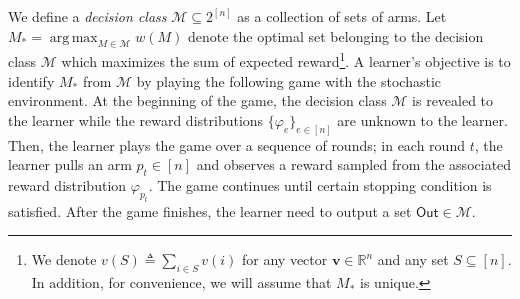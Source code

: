 \documentclass{article}
\newcommand{\Rew}{\varphi}
\newcommand{\E}{\mathbb E}
\newcommand{\M}{\mathcal M}
\newcommand{\RR}{\mathbb R}
\DeclareMathOperator*{\argmax}{arg\,max}
\newcommand{\out}{\mathsf{Out}}
\renewcommand{\vec}[1]{\boldsymbol{#1}}
\begin{document}
We define a \emph{decision class} $\M \subseteq 2^{[n]}$ as a  collection of sets of arms.
Let $M_*=\argmax_{M\in \M} w(M)$ denote the optimal set belonging to the decision class $\M$ which maximizes the sum of expected reward\footnote{We denote $v(S)\triangleq \sum_{i\in S} v(i)$ for any vector $\vec v\in\RR^{n}$ and any set $S \subseteq[n]$. In addition, for convenience, we will assume that $M_*$ is unique.}.
A learner's objective is to identify $M_*$ from $\M$ by playing the following game with the stochastic environment.
At the beginning of the game, the decision class $\M$ is revealed to the learner while the reward distributions $\{\Rew_e\}_{e\in[n]}$ are unknown to the learner.
Then, the learner plays the game over a sequence of rounds;
in each round $t$, the learner pulls an arm $p_t\in [n]$ and observes a reward sampled from the associated reward distribution $\Rew_{p_t}$.
The game continues until certain stopping condition is satisfied.
After the game finishes, the learner need to output a set $\out \in \M$.



\end{document}
